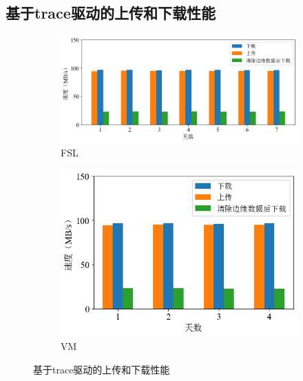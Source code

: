\documentclass[promaster]{thesis-uestc}
\begin{document}
\subsection{基于trace驱动的上传和下载性能}
\begin{figure}[H]
    \centering
    \begin{subfigure}{0.92\textwidth}
        \includegraphics[width=1\linewidth]{pic/real_fsl_upload_download.png}
        \centering
        \captionsetup{width=\textwidth}
        \caption{FSL}
        \label{基于trace驱动的上传和下载性能1}
    \end{subfigure}
    \begin{subfigure}{0.60\textwidth}
        \includegraphics[width=1\linewidth]
        {pic/real_vm_upload_download.png}
        \centering
        \captionsetup{width=\textwidth}
        \caption{VM}
        \label{基于trace驱动的上传和下载性能2}
    \end{subfigure}
    \caption{基于trace驱动的上传和下载性能}
    \label{基于trace驱动的上传和下载性能}
\end{figure}
\end{document}
